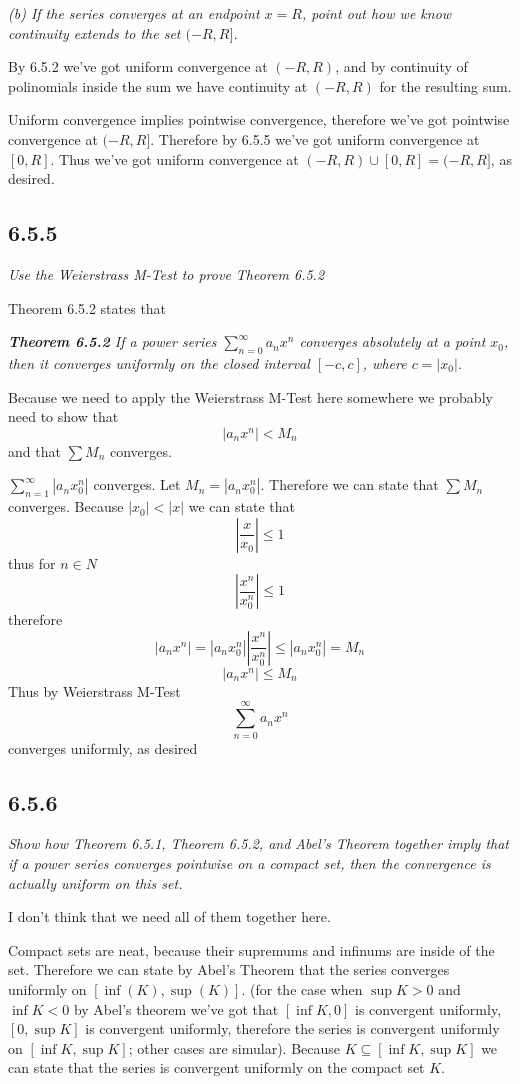 \documentclass[11pt,oneside,titlepage]{book}
\begin{document}
\textit{(b) If the series converges at an endpoint $x = R$, point out how
  we know continuity extends to the set $(-R, R]$.}

By 6.5.2 we've got uniform convergence at $(-R, R)$, and by continuity of
polinomials inside the sum we have continuity at $(-R, R)$ for the resulting
sum.

Uniform convergence implies pointwise convergence, therefore we've got
pointwise convergence at $(-R, R]$. Therefore by 6.5.5 we've got uniform
convergence at $[0, R]$. Thus we've got uniform convergence at
$(-R, R) \cup [0, R] = (-R, R]$, as desired.

\subsection*{6.5.5}
\textit{Use the Weierstrass M-Test to prove Theorem 6.5.2}

Theorem 6.5.2 states that

\textit{\textbf{Theorem 6.5.2} If a power series
  $\sum_{n = 0}^{\infty}{a_nx^n}$ converges absolutely at a point $x_0$, then
  it converges uniformly on the closed interval $[-c, c]$, where $c = |x_0|$.}


Because we need to apply the Weierstrass M-Test here somewhere we probably
need to show that
$$|a_nx^n| < M_n$$
and that $\sum{M_n}$ converges.

$\sum_{n = 1}^{\infty}{|a_n x_0^n|}$ converges. Let $M_n = |a_n x_0^n|$.
Therefore we can state that $\sum {M_n}$ converges. Because $|x_0| < |x|$
we can state that
$$\left|\frac{x}{x_0} \right| \leq 1$$
thus for $n \in N$
$$\left|\frac{x^n}{x_0^n} \right| \leq 1$$
therefore 
$$|a_nx^n| =   |a_n x_0^n|\left|\frac{x^n}{x_0^n}\right|
\leq |a_n x_0^n| = M_n$$
$$|a_nx^n| \leq M_n$$
Thus by Weierstrass M-Test
$$\sum_{n = 0}^{\infty}{a_n x^n}$$
converges uniformly, as desired

\subsection*{6.5.6}
\textit{Show how Theorem 6.5.1, Theorem 6.5.2, and Abel's Theorem together
  imply that if a power series converges pointwise on a compact set, then the
  convergence is actually uniform on this set.}

I don't think that we need all of them together here.

Compact sets are neat, because their supremums and infinums are inside
of the set. Therefore we can state by Abel's Theorem that
the series converges uniformly on $[\inf(K), \sup(K)]$. (for the  case
when $\sup K > 0$ and $\inf K < 0$ by Abel's theorem we've got that
$[\inf K, 0]$ is convergent uniformly, $[0, \sup K]$ is convergent uniformly,
therefore the series is convergent uniformly on  $[\inf K, \sup K]$; other
cases are simular). Because $K \subseteq [\inf K, \sup K]$ we can state that
the series is convergent uniformly on the compact set $K$.
\end{document}

